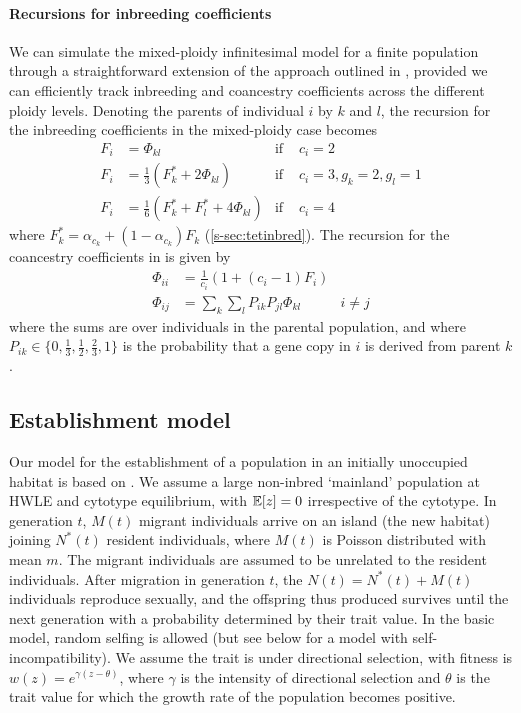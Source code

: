 \documentclass[11pt,a4paper]{article}
\begin{document}
\paragraph{Recursions for inbreeding coefficients}

We can simulate the mixed-ploidy infinitesimal model for a finite population
through a straightforward extension of the approach outlined in
\cite{barton2017}, provided we can efficiently track inbreeding and coancestry
coefficients across the different ploidy levels.
Denoting the parents of individual $i$ by $k$ and $l$, the recursion for the
inbreeding coefficients in the mixed-ploidy case becomes
\begin{align}
    F_i &= \Phi_{kl} & \text{if } & c_i = 2 \\ 
    F_i &= \frac{1}{3}\left(F_k^\ast + 2\Phi_{kl}\right) & \text{if } 
        & c_i = 3, g_k = 2, g_l = 1 \\ 
    F_i &= \frac1 6 (F_k^\ast + F_l^\ast + 4\Phi_{kl}) & \text{if } & c_i = 4
\end{align}
where $F_k^\ast = \alpha_{c_k} + (1-\alpha_{c_k})F_k$ (\cref{s-sec:tetinbred}).
The recursion for the coancestry coefficients in is given by
\begin{align}
    \Phi_{ii} &= \frac{1}{c_{i}} \left(1 + (c_i-1)F_i\right) \nonumber \\
    \Phi_{ij} &= \sum_k \sum_l P_{ik}P_{jl} \Phi_{kl} & i \ne j 
    \label{eq:coancestry}
\end{align}
where the sums are over individuals in the parental population, and where
$P_{ik} \in \{0, \frac1 3, \frac1 2, \frac2 3, 1\}$ is the probability that a
gene copy in $i$ is derived from parent $k$.

\subsection*{Establishment model}

Our model for the establishment of a population in an initially unoccupied
habitat is based on \cite{barton2018}.
We assume a large non-inbred `mainland' population at HWLE and cytotype
equilibrium, with $\mathbb{E}[z] = 0$ irrespective of the cytotype.
In generation $t$, $M(t)$ migrant individuals arrive on an island (the new
habitat) joining $N^\ast(t)$ resident individuals, where $M(t)$ is Poisson
distributed with mean $m$. 
The migrant individuals are assumed to be unrelated to the resident
individuals.
After migration in generation $t$, the $N(t) = N^\ast(t) + M(t)$ individuals
reproduce sexually, and the offspring thus produced survives until the next
generation with a probability determined by their trait value.
In the basic model, random selfing is allowed (but see below for a model with
self-incompatibility).
We assume the trait is under directional selection, with fitness is $w(z) =
e^{\gamma(z - \theta)}$, where $\gamma$ is the intensity of directional
selection and $\theta$ is the trait value for which the growth rate of the
population becomes positive.
\end{document}
